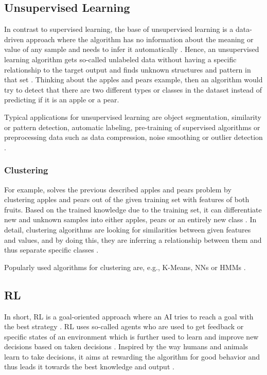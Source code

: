 \documentclass[MGS,Master,english]{twbook}%
\begin{document}
\subsection{Unsupervised Learning} \label{ML::unsupervisedLearning}
In contrast to supervised learning, the base of unsupervised learning is a data-driven approach where the algorithm has no information about the meaning or value of any sample and needs to infer it automatically \cite{ml::book::developer}. Hence, an unsupervised learning algorithm gets so-called unlabeled data without having a specific relationship to the target output and finds unknown structures and pattern in that set \cite{ai::book}. Thinking about the apples and pears example, then an algorithm would try to detect that there are two different types or classes in the dataset instead of predicting if it is an apple or a pear.

Typical applications for unsupervised learning are object segmentation, similarity or pattern detection, automatic labeling, pre-training of supervised algorithms or preprocessing data such as data compression, noise smoothing or outlier detection \cite{ml::book::algorithms} \cite{ai::book}.

\subsubsection{Clustering}
For example, solves the previous described apples and pears problem by clustering apples and pears out of the given training set with features of both fruits. Based on the trained knowledge due to the training set, it can differentiate new and unknown samples into either apples, pears or an entirely new class \cite{ai::book}. In detail, clustering algorithms are looking for similarities between given features and values, and by doing this, they are inferring a relationship between them and thus separate specific classes \cite{ml::book::developer}.

Popularly used algorithms for clustering are, e.g., K-Means, \acp{NN} or \acp{HMM}  \cite{ml::book::developer}.

\subsection{\acl{RL}}
In short, \ac{RL} is a goal-oriented approach where an AI tries to reach a goal with the best strategy \cite{ml::book::developer}. RL uses so-called agents who are used to get feedback or specific states of an environment which is further used to learn and improve new decisions based on taken decisions \cite{ml::book::developer}. Inspired by the way humans and animals learn to take decisions, it aims at rewarding the algorithm for good behavior and thus leads it towards the best knowledge and output \cite{ai::book}. 
\end{document}
